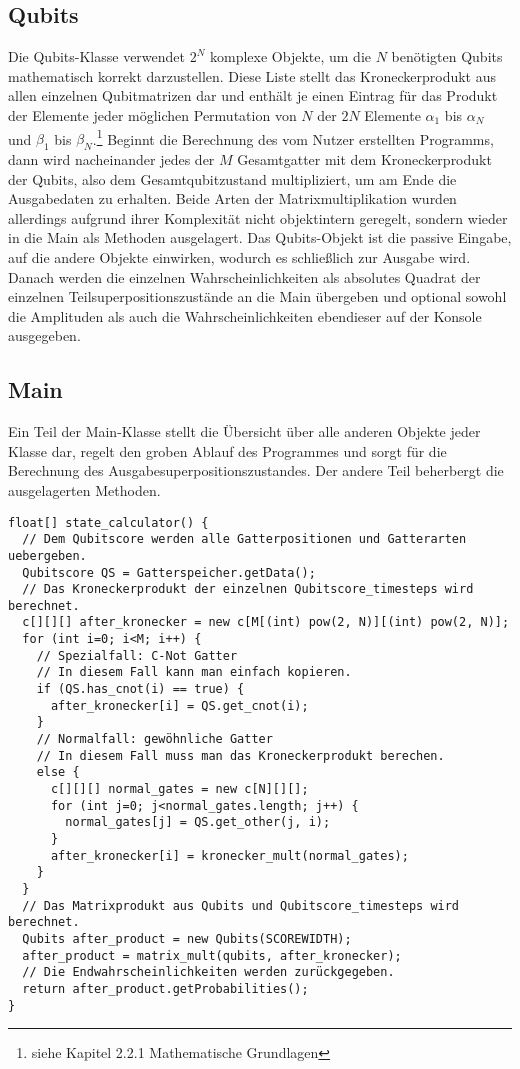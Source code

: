 \documentclass[12pt]{report}
\begin{document}
\subsection{Qubits}
Die \glqq Qubits\grqq{}-Klasse verwendet $2^{N}$ komplexe Objekte, um die $N$ benötigten Qubits mathematisch korrekt darzustellen. Diese Liste stellt das Kroneckerprodukt aus allen einzelnen Qubitmatrizen dar und enthält je einen Eintrag für das Produkt der Elemente jeder möglichen Permutation von $N$ der $2N$ Elemente $\alpha_1$ bis $\alpha_{N}$ und $\beta_1$ bis $\beta_{N}$.\footnote{siehe Kapitel 2.2.1 Mathematische Grundlagen} Beginnt die Berechnung des vom Nutzer erstellten Programms, dann wird nacheinander jedes der $M$ Gesamtgatter mit dem Kroneckerprodukt der Qubits, also dem Gesamtqubitzustand multipliziert, um am Ende die Ausgabedaten zu erhalten. Beide Arten der Matrixmultiplikation wurden allerdings aufgrund ihrer Komplexität nicht objektintern geregelt, sondern wieder in die Main als Methoden ausgelagert. Das \glqq Qubits\grqq{}-Objekt ist die passive Eingabe, auf die andere Objekte einwirken, wodurch es schließlich zur Ausgabe wird. Danach werden die einzelnen Wahrscheinlichkeiten als absolutes Quadrat der einzelnen Teilsuperpositionszustände an die Main übergeben und optional sowohl die Amplituden als auch die Wahrscheinlichkeiten ebendieser auf der Konsole ausgegeben.

\subsection{Main}
Ein Teil der \glqq Main\grqq{}-Klasse stellt die Übersicht über alle anderen Objekte jeder Klasse dar, regelt den groben Ablauf des Programmes und sorgt für die Berechnung des Ausgabesuperpositionszustandes. Der andere Teil beherbergt die ausgelagerten Methoden.
\lstset{escapechar=@,style=customc}
\begin{lstlisting}
float[] state_calculator() {
  // Dem Qubitscore werden alle Gatterpositionen und Gatterarten uebergeben.
  Qubitscore QS = Gatterspeicher.getData();
  // Das Kroneckerprodukt der einzelnen Qubitscore_timesteps wird berechnet.
  c[][][] after_kronecker = new c[M[(int) pow(2, N)][(int) pow(2, N)];
  for (int i=0; i<M; i++) {
  	// Spezialfall: C-Not Gatter
  	// In diesem Fall kann man einfach kopieren.
    if (QS.has_cnot(i) == true) {
      after_kronecker[i] = QS.get_cnot(i);
    }
    // Normalfall: gewöhnliche Gatter
    // In diesem Fall muss man das Kroneckerprodukt berechen.
    else {
      c[][][] normal_gates = new c[N][][];
      for (int j=0; j<normal_gates.length; j++) {
        normal_gates[j] = QS.get_other(j, i);
      }
      after_kronecker[i] = kronecker_mult(normal_gates);
    }
  }
  // Das Matrixprodukt aus Qubits und Qubitscore_timesteps wird berechnet.
  Qubits after_product = new Qubits(SCOREWIDTH);
  after_product = matrix_mult(qubits, after_kronecker);
  // Die Endwahrscheinlichkeiten werden zurückgegeben.
  return after_product.getProbabilities();
}
\end{lstlisting}
\end{document}
